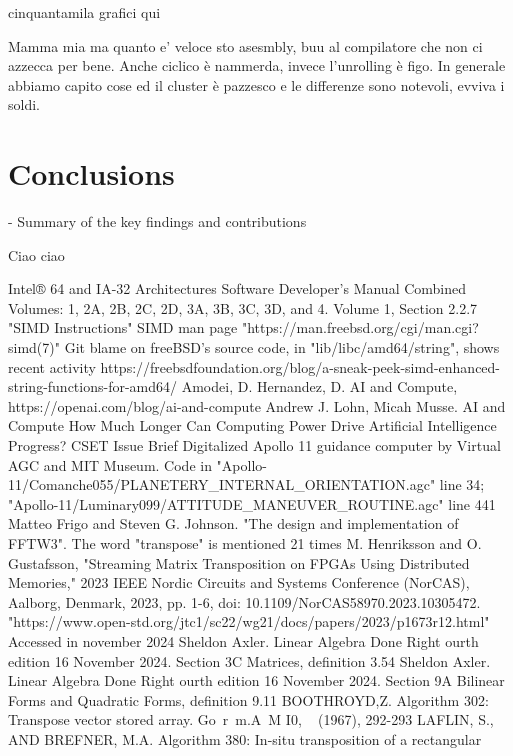 \documentclass[conference]{IEEEtran}
\begin{document}
cinquantamila grafici qui

Mamma mia ma quanto e' veloce sto asesmbly,
buu al compilatore che non ci azzecca per bene. 
Anche ciclico è nammerda, invece l'unrolling
è figo.
In generale abbiamo capito
cose ed il cluster è pazzesco e le differenze
sono notevoli, evviva i soldi.


\section{Conclusions}

- Summary of the key findings and contributions

Ciao ciao

\begin{thebibliography}{00}
 Intel® 64 and IA-32 Architectures Software Developer’s Manual Combined Volumes: 1, 2A, 2B, 2C, 2D, 3A, 3B, 3C, 3D, and 4. Volume 1, Section 2.2.7 "SIMD Instructions"
 SIMD man page "https://man.freebsd.org/cgi/man.cgi?simd(7)"
 Git blame on freeBSD's source code, in "lib/libc/amd64/string", shows recent activity
 https://freebsdfoundation.org/blog/a-sneak-peek-simd-enhanced-string-functions-for-amd64/
 Amodei, D. Hernandez, D. AI and Compute, https://openai.com/blog/ai-and-compute
 Andrew J. Lohn, Micah Musse. AI and Compute How Much Longer Can Computing Power Drive Artificial Intelligence Progress? CSET Issue Brief
 Digitalized Apollo 11 guidance computer by Virtual AGC and MIT Museum. Code in "Apollo-11/Comanche055/PLANETERY\_INTERNAL\_ORIENTATION.agc" line 34; "Apollo-11/Luminary099/ATTITUDE\_MANEUVER\_ROUTINE.agc" line 441
 Matteo Frigo and Steven G. Johnson. "The design and implementation of FFTW3". The word "transpose" is mentioned 21 times
 M. Henriksson and O. Gustafsson, "Streaming Matrix Transposition on FPGAs Using Distributed Memories," 2023 IEEE Nordic Circuits and Systems Conference (NorCAS), Aalborg, Denmark, 2023, pp. 1-6, doi: 10.1109/NorCAS58970.2023.10305472.
 "https://www.open-std.org/jtc1/sc22/wg21/docs/papers/2023/p1673r12.html" Accessed in november 2024
 Sheldon Axler. Linear Algebra Done Right ourth edition
16 November 2024. Section 3C Matrices, definition 3.54
 Sheldon Axler. Linear Algebra Done Right ourth edition
16 November 2024. Section 9A Bilinear Forms and Quadratic Forms, definition 9.11
 BOOTHROYD,Z. Algorithm 302: Transpose vector stored array. Go~r~m.A~M I0, ~ (1967),
292-293
 LAFLIN, S., AND BREFNER, M.A. Algorithm 380: In-situ transposition of a rectangular

\end{thebibliography}
\end{document}
